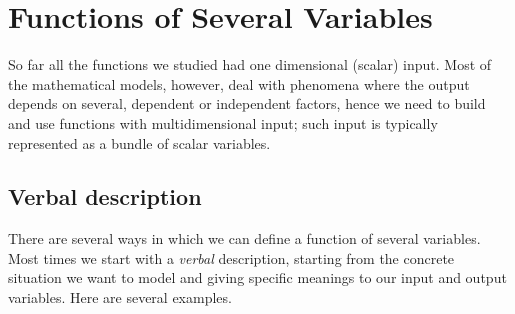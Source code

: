 \section{Functions of Several Variables}

So far all the functions we studied had one
dimensional (scalar) input. Most of the mathematical
models, however, deal with phenomena where the output
depends on several, dependent or independent factors,
hence we need to build and use
functions with multidimensional input; such input is
typically represented as a bundle of scalar variables.

\subsection{Verbal description}

There are several ways in which we can define a
function of several variables. Most times we start with
a \emph{verbal} description, starting from the concrete
situation we want to model and giving specific meanings
to our input and output variables. Here are several examples.


